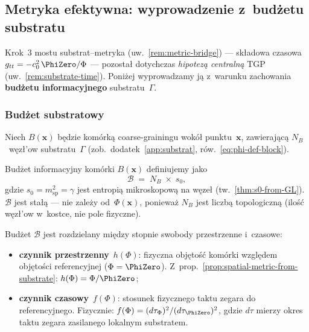 
\subsection{Metryka efektywna: wyprowadzenie z~bud\.zetu substratu}%
\label{ssec:metric-from-budget}

Krok~3 mostu substrat--metryka
(uw.~\ref{rem:metric-bridge}) --- sk\l{}adowa czasowa
$g_{tt} = -c_0^2\,\PhiZero/\Phi$ --- pozosta\l{} dotychczas
\emph{hipotez\k{a} centraln\k{a}} TGP
(uw.~\ref{rem:substrate-time}).
Poni\.zej wyprowadzamy j\k{a} z~warunku zachowania
\textbf{bud\.zetu informacyjnego} substratu~$\Gamma$.

\subsubsection{Bud\.zet substratowy}%
\label{sssec:substrate-budget}

Niech $B(\mathbf{x})$ b\k{e}dzie kom\'ork\k{a} coarse-grainingu
wok\'o\l{} punktu~$\mathbf{x}$, zawieraj\k{a}c\k{a} $N_B$~w\k{e}z\l{}'ow
substratu~$\Gamma$ (zob.\ dodatek~\ref{app:substrat},
r\'ow.~\eqref{eq:phi-def-block}).

\begin{definition}%
\label{def:info-budget}
Bud\.zet informacyjny kom\'orki $B(\mathbf{x})$ definiujemy jako
\begin{equation}\label{eq:budget-def}
  \mathcal{B} \;=\;
  N_B \;\times\; s_0,
\end{equation}
gdzie $s_0 = m_{\mathrm{sp}}^2 = \gamma$ jest entropi\k{a}
mikroskopow\k{a} na w\k{e}ze\l{} (tw.~\ref{thm:s0-from-GL}).
$\mathcal{B}$ jest sta\l{}\k{a} --- nie zale\.zy od~$\Phi(\mathbf{x})$,
poniewa\.z $N_B$ jest liczb\k{a} topologiczn\k{a}
(ilo\'s\'c w\k{e}z\l{}'ow w~kostce, nie pole fizyczne).
\end{definition}

Bud\.zet $\mathcal{B}$ jest rozdzielany mi\k{e}dzy stopnie swobody
przestrzenne i~czasowe:
\begin{itemize}[nosep]
  \item \textbf{czynnik przestrzenny}~$h(\Phi)$:
        fizyczna obj\k{e}to\'s\'c kom\'orki wzgl\k{e}dem
        obj\k{e}to\'sci referencyjnej ($\Phi = \PhiZero$).
        Z~prop.~\ref{prop:spatial-metric-from-substrate}:
        $h(\Phi) = \Phi/\PhiZero$;
  \item \textbf{czynnik czasowy}~$f(\Phi)$:
        stosunek fizycznego taktu zegara do referencyjnego.
        Fizycznie: $f(\Phi) = (d\tau_{\Phi})^2 / (d\tau_{\PhiZero})^2$,
        gdzie $d\tau$ mierzy okres taktu zegara zasilanego
        lokalnym substratem.
\end{itemize}

